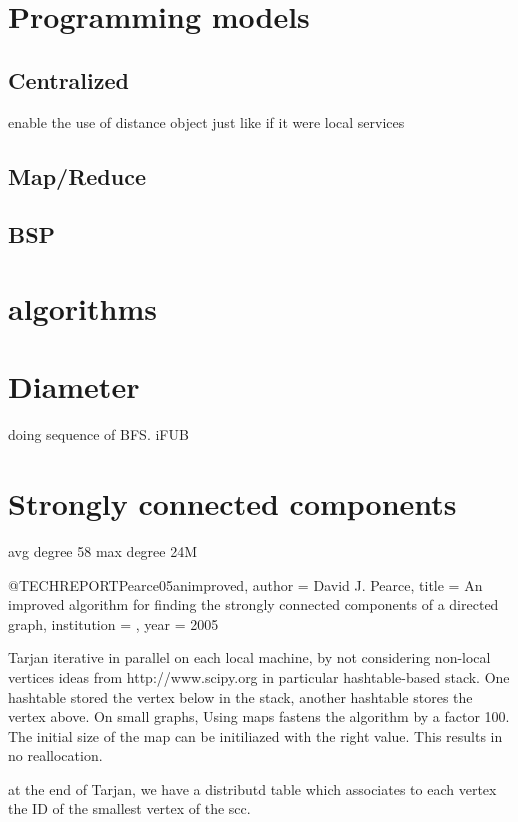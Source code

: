 \documentclass[11pt,a4paper]{article}
\begin{document}
\section{Programming models}
\subsection{Centralized}

enable the use of distance object just like if it were local
services

\subsection{Map/Reduce}



\subsection{BSP}


\section{algorithms}

\section{Diameter}
doing sequence of BFS.
iFUB

\section{Strongly connected components}
avg degree 58
max degree 24M


@TECHREPORT{Pearce05animproved,
    author = {David J. Pearce},
    title = {An improved algorithm for finding the strongly connected components of a directed graph},
    institution = {},
    year = {2005}
}

Tarjan iterative in parallel on each local machine, by not considering non-local vertices
ideas from http://www.scipy.org
in particular hashtable-based stack. One hashtable stored the vertex below in the stack, another hashtable stores the vertex above.
On small graphs, Using maps fastens the algorithm by a factor 100. The initial size of the map can be initiliazed with the right value. This results in no reallocation.

at the end of Tarjan, we have a distributd table which associates to each vertex the ID of the smallest vertex of the scc.
\end{document}
